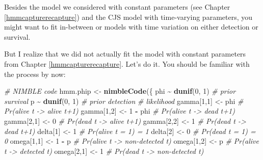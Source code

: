 \documentclass[
  12pt,
]{krantz}
\newenvironment{Shaded}{\begin{snugshade}}{\end{snugshade}}
\newcommand{\CommentTok}[1]{\textcolor[rgb]{0.56,0.35,0.01}{\textit{#1}}}
\newcommand{\DecValTok}[1]{\textcolor[rgb]{0.00,0.00,0.81}{#1}}
\newcommand{\FunctionTok}[1]{\textcolor[rgb]{0.13,0.29,0.53}{\textbf{#1}}}
\newcommand{\NormalTok}[1]{#1}
\newcommand{\OtherTok}[1]{\textcolor[rgb]{0.56,0.35,0.01}{#1}}
\newcommand{\SpecialCharTok}[1]{\textcolor[rgb]{0.81,0.36,0.00}{\textbf{#1}}}
\begin{document}
Besides the model we considered with constant parameters (see Chapter \ref{hmmcapturerecapture}) and the CJS model with time-varying parameters, you might want to fit in-between or models with time variation on either detection or survival.

But I realize that we did not actually fit the model with constant parameters from Chapter \ref{hmmcapturerecapture}. Let's do it. You should be familiar with the process by now:

\begin{Shaded}
\begin{Highlighting}[]
\CommentTok{\# NIMBLE code }
\NormalTok{hmm.phip }\OtherTok{\textless{}{-}} \FunctionTok{nimbleCode}\NormalTok{(\{}
\NormalTok{  phi }\SpecialCharTok{\textasciitilde{}} \FunctionTok{dunif}\NormalTok{(}\DecValTok{0}\NormalTok{, }\DecValTok{1}\NormalTok{)      }\CommentTok{\# prior survival}
\NormalTok{  p }\SpecialCharTok{\textasciitilde{}} \FunctionTok{dunif}\NormalTok{(}\DecValTok{0}\NormalTok{, }\DecValTok{1}\NormalTok{)        }\CommentTok{\# prior detection}
  \CommentTok{\# likelihood}
\NormalTok{  gamma[}\DecValTok{1}\NormalTok{,}\DecValTok{1}\NormalTok{] }\OtherTok{\textless{}{-}}\NormalTok{ phi      }\CommentTok{\# Pr(alive t {-}\textgreater{} alive t+1)}
\NormalTok{  gamma[}\DecValTok{1}\NormalTok{,}\DecValTok{2}\NormalTok{] }\OtherTok{\textless{}{-}} \DecValTok{1} \SpecialCharTok{{-}}\NormalTok{ phi  }\CommentTok{\# Pr(alive t {-}\textgreater{} dead t+1)}
\NormalTok{  gamma[}\DecValTok{2}\NormalTok{,}\DecValTok{1}\NormalTok{] }\OtherTok{\textless{}{-}} \DecValTok{0}        \CommentTok{\# Pr(dead t {-}\textgreater{} alive t+1)}
\NormalTok{  gamma[}\DecValTok{2}\NormalTok{,}\DecValTok{2}\NormalTok{] }\OtherTok{\textless{}{-}} \DecValTok{1}        \CommentTok{\# Pr(dead t {-}\textgreater{} dead t+1)}
\NormalTok{  delta[}\DecValTok{1}\NormalTok{] }\OtherTok{\textless{}{-}} \DecValTok{1}          \CommentTok{\# Pr(alive t = 1) = 1}
\NormalTok{  delta[}\DecValTok{2}\NormalTok{] }\OtherTok{\textless{}{-}} \DecValTok{0}          \CommentTok{\# Pr(dead t = 1) = 0}
\NormalTok{  omega[}\DecValTok{1}\NormalTok{,}\DecValTok{1}\NormalTok{] }\OtherTok{\textless{}{-}} \DecValTok{1} \SpecialCharTok{{-}}\NormalTok{ p    }\CommentTok{\# Pr(alive t {-}\textgreater{} non{-}detected t)}
\NormalTok{  omega[}\DecValTok{1}\NormalTok{,}\DecValTok{2}\NormalTok{] }\OtherTok{\textless{}{-}}\NormalTok{ p        }\CommentTok{\# Pr(alive t {-}\textgreater{} detected t)}
\NormalTok{  omega[}\DecValTok{2}\NormalTok{,}\DecValTok{1}\NormalTok{] }\OtherTok{\textless{}{-}} \DecValTok{1}        \CommentTok{\# Pr(dead t {-}\textgreater{} non{-}detected t)}

\end{Highlighting}
\end{Shaded}
\end{document}
